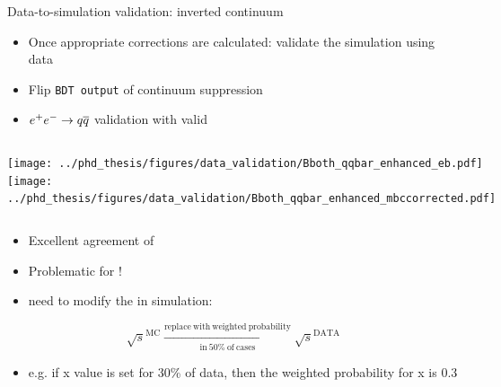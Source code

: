 \documentclass[xcolor=dvipsnames]{beamer}
\begin{document}
\begin{frame}{Data-to-simulation validation: inverted continuum}
   \scriptsize\centering
   \begin{itemize}
      \item Once appropriate corrections are calculated: validate the simulation using data
      \item Flip \texttt{BDT output} of continuum suppression
      \item[\ra]  $e^+e^-\rightarrow q\overline q$ validation with valid \Mbc
   \end{itemize}

   \begin{columns}
      \centering
         \texttt{[image: ../phd\_thesis/figures/data\_validation/Bboth\_qqbar\_enhanced\_eb.pdf]}
      \centering
         \texttt{[image: ../phd\_thesis/figures/data\_validation/Bboth\_qqbar\_enhanced\_mbccorrected.pdf]}
   \end{columns}

   \begin{itemize}
      \item Excellent agreement of \EB
      \item Problematic for \Mbc!
      \item[\ra] need to modify the \Mbc in simulation:  
   \end{itemize}
   \begin{equation*}
      \sqrt{s}^{\mathrm{MC}} \xrightarrow[\mathrm{in~50\%~of~cases}]{\mathrm{replace~with~weighted~probability}} \sqrt{s}^{\mathrm{DATA}}
   \end{equation*}

   \begin{itemize}
   \item[\ra] e.g. if x value is set for 30\% of data, then the weighted probability for x is 0.3
\end{itemize}
\end{frame}
\end{document}
